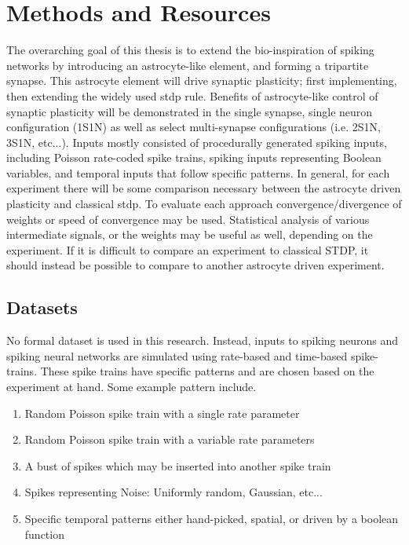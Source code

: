 %
%


\chapter{Methods and Resources} \label{section:methods}
    The overarching goal of this thesis is to extend the bio-inspiration of
    spiking networks by introducing an astrocyte-like element, and forming a
    tripartite synapse. This astrocyte element will drive synaptic plasticity;
    first implementing, then extending the widely used \gls{stdp} rule. Benefits of
    astrocyte-like control of synaptic plasticity will be demonstrated in the
    single synapse, single neuron configuration (1S1N) as well as select
    multi-synapse configurations (i.e. 2S1N, 3S1N, etc...). Inputs mostly
    consisted of procedurally generated spiking inputs, including Poisson
    rate-coded spike trains, spiking inputs representing Boolean variables, and
    temporal inputs that follow specific patterns. In general, for each
    experiment there will be some comparison necessary between the astrocyte
    driven plasticity and classical \gls{stdp}. To evaluate each approach
    convergence/divergence of weights or speed of convergence may be
    used. Statistical analysis of various intermediate signals, or the weights
    may be useful as well, depending on the experiment. If it is difficult to
    compare an experiment to classical STDP, it should instead be possible to
    compare to another astrocyte driven experiment.

    \section{Datasets} \label{section:datasets}
    No formal dataset is used in this research. Instead, inputs to spiking
    neurons and spiking neural networks are simulated using rate-based and
    time-based spike-trains. These spike trains have specific patterns and are
    chosen based on the experiment at hand. Some example pattern include.
    \begin{enumerate}
    \item Random Poisson spike train with a single rate parameter
    \item Random Poisson spike train with a variable rate parameters
    \item A bust of spikes which may be inserted into another spike train
    \item Spikes representing Noise: Uniformly random, Gaussian, etc...
    \item Specific temporal patterns either hand-picked, spatial, or driven by a
      boolean function
    \end{enumerate}
        
